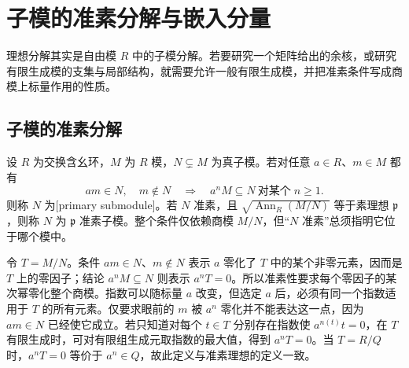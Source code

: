 
\section{子模的准素分解与嵌入分量}
\label{b3:sec:0404}

理想分解其实是自由模 \(R\) 中的子模分解。若要研究一个矩阵给出的余核，或研究有限生成模的支集与局部结构，就需要允许一般有限生成模，并把准素条件写成商模上标量作用的性质。

\subsection{子模的准素分解}
\label{b3:subsec:0404:01}

\begin{definition}\label{b3:def:primary-submodule}
	设 \(R\) 为交换含幺环，\(M\) 为 \(R\) 模，\(N\subsetneq M\) 为真子模。若对任意 \(a\in R\)、\(m\in M\) 都有
	\[
		am\in N,\quad m\notin N \quad\Longrightarrow\quad a^nM\subseteq N \ \text{对某个}\;n\ge1.
	\]
	则称 \(N\) 为[primary submodule]。若 \(N\) 准素，且 \(\sqrt{\operatorname{Ann}_R(M/N)}\) 等于素理想 \(\mathfrak p\)，则称 \(N\) 为 \(\mathfrak p\) 准素子模。整个条件仅依赖商模 \(M/N\)，但“\(N\) 准素”总须指明它位于哪个模中。
\end{definition}

令 \(T=M/N\)。条件 \(am\in N\)、\(m\notin N\) 表示 \(a\) 零化了 \(T\) 中的某个非零元素，因而是 \(T\) 上的零因子；结论 \(a^nM\subseteq N\) 则表示 \(a^nT=0\)。所以准素性要求每个零因子的某次幂零化整个商模。指数可以随标量 \(a\) 改变，但选定 \(a\) 后，必须有同一个指数适用于 \(T\) 的所有元素。仅要求眼前的 \(m\) 被 \(a^n\) 零化并不能表达这一点，因为 \(am\in N\) 已经使它成立。若只知道对每个 \(t\in T\) 分别存在指数使 \(a^{n(t)}t=0\)，在 \(T\) 有限生成时，可对有限组生成元取指数的最大值，得到 \(a^nT=0\)。当 \(T=R/Q\) 时，\(a^nT=0\) 等价于 \(a^n\in Q\)，故此定义与准素理想的定义一致。

